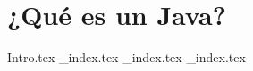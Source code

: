 \chapter{¿Qué es un Java?}
  \label{ch:java}
  {Intro.tex}
  {_index.tex}
  {_index.tex}
  {_index.tex}
  
  \printbibliography[keyword=Java]